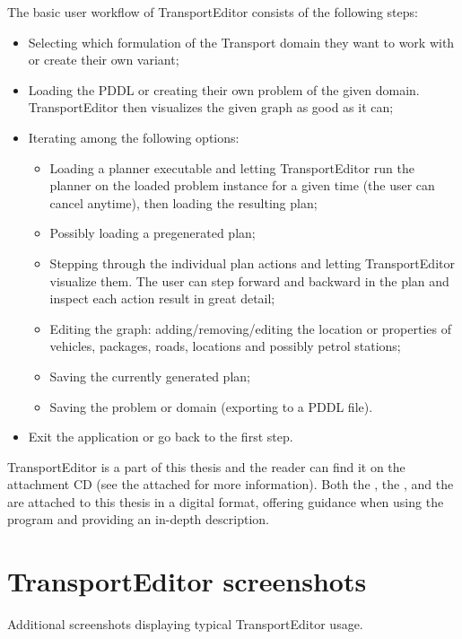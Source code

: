 The basic user workflow of TransportEditor consists of the following steps:
\begin{itemize}
\item Selecting which formulation of the Transport domain they want to work with or create their own variant;
\item Loading the PDDL or creating their own problem of the given domain. TransportEditor then visualizes the given graph as good as it can;
\item Iterating among the following options:
\begin{itemize}
\item Loading a planner executable and letting TransportEditor run the planner on the loaded problem instance for a given time (the user can cancel anytime),
then loading the resulting plan;
\item Possibly loading a pregenerated plan;
\item Stepping through the individual plan actions and letting TransportEditor visualize them.
The user can step forward and backward in the plan and inspect each action result in great detail;
\item Editing the graph: adding/removing/editing the location or properties of vehicles, packages, roads, locations and possibly petrol stations;
\item Saving the currently generated plan;
\item Saving the problem or domain (exporting to a PDDL file).
\end{itemize}
\item Exit the application or go back to the first step.
\end{itemize}

TransportEditor is a part of this thesis and the reader can find it on the attachment CD (see the attached  for more information). Both the ,
the , and the  are attached to this thesis in a digital format, offering guidance when
using the program and providing an in-depth description.

\newpage

\section*{TransportEditor screenshots}\label{transport-editor-screenshots}

Additional screenshots displaying typical TransportEditor usage.
\medskip

